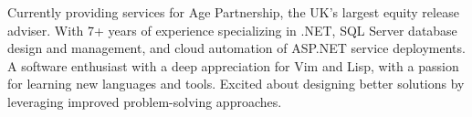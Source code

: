 

\begin{cvparagraph}

Currently providing services for Age Partnership, the UK's largest equity
release adviser. With 7+ years of experience specializing in .NET, SQL Server
database design and management, and cloud automation of ASP.NET service
deployments. A software enthusiast with a deep appreciation for Vim and Lisp, with a passion for learning new languages and tools. Excited about designing better solutions by leveraging improved problem-solving approaches.
\end{cvparagraph}

